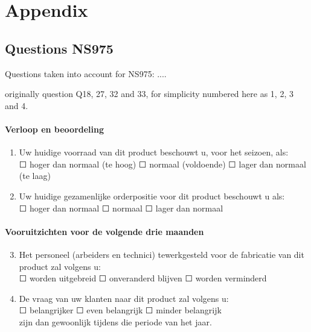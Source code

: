 \documentclass[12pt,a4paper,oneside]{book}
\begin{document}
  
\begin{appendix}
  \listoffigures
  \listoftables
\end{appendix}


\chapter*{Appendix}

\section{Questions NS975}
\label{Appendix: Question NS975 description}
Questions taken into account for NS975:
....

originally question Q18, 27, 32 and 33, for simplicity numbered here as 1, 2, 3 and 4.

\subsubsection*{Verloop en beoordeling}
\begin{enumerate}
    \item Uw huidige voorraad van dit product beschouwt u, voor het seizoen, als: \\
	$\Square$	hoger dan normaal (te hoog)	$\Square$	normaal (voldoende)	$\Square$ lager dan normaal (te laag)
	
    \item Uw huidige gezamenlijke orderpositie voor dit product beschouwt u als: \\
	$\Square$ hoger dan normaal $\Square$ normaal $\Square$ lager dan normaal
\end{enumerate}

\subsubsection*{Vooruitzichten voor de volgende drie maanden} 
\begin{enumerate}
\setcounter{enumi}{2}
    \item Het personeel (arbeiders en technici) tewerkgesteld voor de fabricatie van dit product zal volgens u: \\
	$\Square$ worden uitgebreid $\Square$ onveranderd blijven $\Square$ worden verminderd
						
    \item De vraag van uw klanten naar dit product zal volgens u:  \\
	$\Square$ belangrijker $\Square$ even belangrijk $\Square$ minder belangrijk \\	
	zijn dan gewoonlijk tijdens die periode van het jaar.
\end{enumerate}
\end{document}

